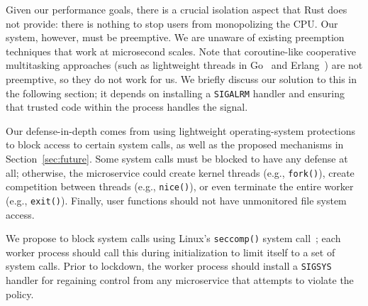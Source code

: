 Given our performance goals, there is a crucial isolation aspect that
Rust does not provide: there is nothing to stop users from monopolizing the CPU\@.
Our system, however, must be preemptive. We are unaware of existing preemption
techniques that work at microsecond scales. Note that coroutine-like
cooperative multitasking approaches (such as lightweight threads in
Go~\cite{www-golang} and Erlang~\cite{www-erlang}) are not preemptive, so they
do not work for us. We briefly discuss our solution to this in the following section;
it depends on installing a \texttt{SIGALRM} handler and ensuring that trusted
code within the process handles the signal.

Our defense-in-depth comes from using lightweight operating-system protections
to block access to certain system calls, as well as the proposed mechanisms
in Section~\ref{sec:future}.  Some system calls must be blocked to have any
defense at all; otherwise, the microservice could create kernel threads (e.g.,
\texttt{fork()}), create competition between threads (e.g., \texttt{nice()}), or even
terminate the entire worker (e.g., \texttt{exit()}). Finally, user functions should
not have unmonitored file system access.

We propose to block system calls using Linux's \texttt{seccomp()} system
call~\cite{seccomp-manpage}; each worker process should call this during
initialization to limit itself to a  set of system calls.
Prior to lockdown, the worker process should install a \texttt{SIGSYS} handler
for regaining control from any microservice that attempts to violate the policy.
